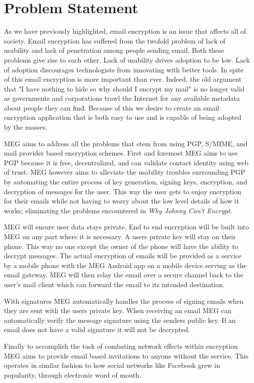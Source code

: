 \documentclass[11pt]{article}
\begin{document}
\section{Problem Statement}
\par As we have previously highlighted, email encryption is an issue that affects all of society. Email encryption has suffered from the twofold problem of lack of usability and lack of penetration among people sending email. Both these problems give rise to each other. Lack of usability drives adoption to be low. Lack of adoption discourages technologists from innovating with better tools. In spite of this email encryption is more important than ever. Indeed, the old argument that "I have nothing to hide so why should I encrypt my mail" is no longer valid as governments and corporations trawl the Internet for any available metadata about people they can find. Because of this we desire to create an email encryption application that is both easy to use and is capable of being adopted by the masses.
\par MEG aims to address all the problems that stem from using PGP, S/MIME, and mail provider based encryption schemes. First and foremost MEG aims to use PGP because it is free, decentralized, and can validate contact identity using web of trust. MEG however aims to alleviate the usability troubles surrounding PGP by automating the entire process of key generation, signing keys, encryption, and decryption of messages for the user. This way the user gets to enjoy encryption for their emails while not having to worry about the low level details of how it works; eliminating the problems encountered in \textit{Why Johnny Can't Encrypt}\cite{whitten1999johnny}.
\par MEG will ensure user data stays private. End to end encryption will be built into MEG on any part where it is necessary. A users private key will stay on their phone. This way no one except the owner of the phone will have the ability to decrypt messages. The actual encryption of emails will be provided as a service by a mobile phone with the MEG Android app on a mobile device serving as the email gateway. MEG will then relay the email over a secure channel back to the user's mail client which can forward the email to its intended destination.
\par With signatures MEG automatically handles the process of signing emails when they are sent with the users private key. When receiving an email MEG can automatically verify the message signature using the senders public key. If an email does not have a valid signature it will not be decrypted.
\par Finally to accomplish the task of combating network effects within encryption MEG aims to provide email based invitations to anyone without the service. This operates in similar fashion to how social networks like Facebook grew in popularity, through electronic word of mouth\cite{trusov2009effects}.
\end{document}
